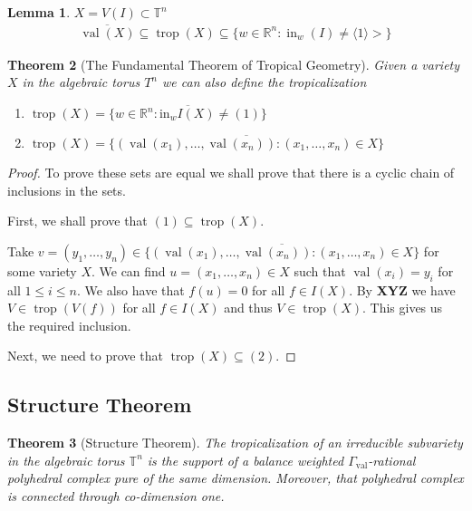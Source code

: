 \documentclass[12pt,a4paper]{amsart}
\newcommand{\trop}[1]{\operatorname{trop}(#1)}
\newcommand{\val}[1]{\operatorname{val}(#1)}
\newcommand{\Gval}{\Gamma_{\operatorname{val}}}
\newcommand{\init}[2]{\operatorname{in}_{#1}(#2)}
\newcommand{\initw}[1]{\init{w}{#1}}
\newcommand{\R}{\mathbb{R}}
\newcommand{\T}{\mathbb{T}}
\newtheorem{thm}{Theorem}[section]
\newtheorem{lem}[thm]{Lemma}
\theoremstyle{definition}
\theoremstyle{remark}
\begin{document}
\begin{lem}
$X=V(I)\subset\T^n$
\begin{align*}
    \overline{\val{X}}\subseteq\trop{X}\subseteq\{ w\in\R^n : \initw{I} \neq \langle1\rangle> \}
\end{align*}
\end{lem}

\begin{thm}[The Fundamental Theorem of Tropical Geometry]
Given a variety $X$ in the algebraic torus $T^n$ we can also define the tropicalization
\begin{enumerate}
    \item $\trop{X} = \overline{\{ w\in\R^n : \text{in}_wI(X) \neq (1) \}}$
    \item $\trop{X} = \overline{\{ (\val{x_1},\dots,\val{x_n}) : (x_1,\dots,x_n)\in X \}}$
\end{enumerate}
\end{thm}

\begin{proof}
To prove these sets are equal we shall prove that there is a cyclic chain of inclusions in the sets.

First, we shall prove that $(1)\subseteq\trop{X}$.

\noindent Take $v = (y_1,\dots,y_n)\in\overline{\{ (\val{x_1},\dots,\val{x_n}) : (x_1,\dots,x_n)\in X \}}$ for some variety $X$. We can find $u = (x_1,\dots,x_n)\in X$ such that $\val{x_i} = y_i$ for all $1\leq i\leq n$. We also have that $f(u) = 0$ for all $f\in I(X)$. By \textbf{XYZ} we have $V\in\trop{V(f)}$ for all $f\in I(X)$ and thus $V\in \trop{X}$. This gives us the required inclusion.

Next, we need to prove that $\trop{X}\subseteq(2)$.

\noindent
\end{proof}

\subsection{Structure Theorem}
\begin{thm}[Structure Theorem]
The tropicalization of an irreducible subvariety in the algebraic torus $\T^n$ is the support of a balance weighted $\Gval$-rational polyhedral complex pure of the same dimension.
Moreover, that polyhedral complex is connected through co-dimension one.
\end{thm}
\end{document}

